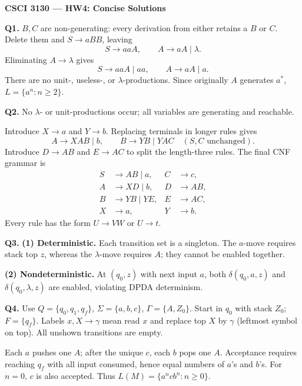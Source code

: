 \documentclass[11pt,a4paper]{article}
\begin{document}
\begin{center}
{\large\bfseries CSCI 3130 --- HW4: Concise Solutions}
\end{center}

\textbf{Q1.}
$B,C$ are non-generating: every derivation from either retains a $B$ or $C$.
Delete them and $S\to aBB$, leaving
\[
S\to aaA,\qquad A\to aA\mid\lambda.
\]
Eliminating $A\to\lambda$ gives
\[
\boxed{S\to aaA\mid aa,\qquad A\to aA\mid a.}
\]
There are no unit-, useless-, or $\lambda$-productions.
Since originally $A$ generates $a^*$, $\boxed{L=\{a^n:n\ge2\}}$.

\medskip
\textbf{Q2.}
No $\lambda$- or unit-productions occur; all variables are generating and reachable.

Introduce $X\to a$ and $Y\to b$. Replacing terminals in longer rules gives
\[
A\to XAB\mid b,\qquad B\to YB\mid YAC
\quad(S,C\text{ unchanged}).
\]
Introduce $D\to AB$ and $E\to AC$ to split the length-three rules.
The final CNF grammar is
\[
\boxed{\begin{aligned}
S&\to AB\mid a, & C&\to c,\\
A&\to XD\mid b, & D&\to AB,\\
B&\to YB\mid YE, & E&\to AC,\\
X&\to a, & Y&\to b.
\end{aligned}}
\]
Every rule has the form $U\to VW$ or $U\to t$.

\medskip
\textbf{Q3.}
\textbf{(1) Deterministic.} Each transition set is a singleton.
The $a$-move requires stack top $z$, whereas the $\lambda$-move requires $A$;
they cannot be enabled together.

\textbf{(2) Nondeterministic.}
At $(q_0,z)$ with next input $a$, both $\delta(q_0,a,z)$ and
$\delta(q_0,\lambda,z)$ are enabled, violating DPDA determinism.

\medskip
\textbf{Q4.}
Use $Q=\{q_0,q_1,q_f\}$, $\Sigma=\{a,b,c\}$, $\Gamma=\{A,Z_0\}$.
Start in $q_0$ with stack $Z_0$; $F=\{q_f\}$.
Labels $x,X\to\gamma$ mean read $x$ and replace top $X$ by $\gamma$
(leftmost symbol on top). All unshown transitions are empty.

\begin{center}
\end{center}

Each $a$ pushes one $A$; after the unique $c$, each $b$ pops one $A$.
Acceptance requires reaching $q_f$ with all input consumed, hence equal numbers
of $a$'s and $b$'s. For $n=0$, $c$ is also accepted. Thus $L(M)=\{a^ncb^n:n\ge0\}$.
\end{document}
